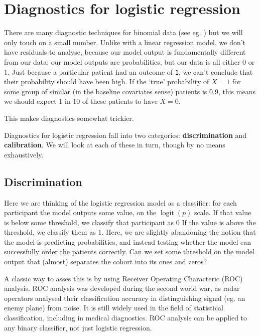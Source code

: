 \documentclass[
  openany]{book}
\theoremstyle{definition}
\theoremstyle{definition}
\theoremstyle{definition}
\theoremstyle{definition}
\theoremstyle{remark}
\begin{document}
\hypertarget{diagnostics-for-logistic-regression}{%
\section{Diagnostics for logistic regression}\label{diagnostics-for-logistic-regression}}

There are many diagnostic techniques for binomial data (see eg. \citet{collett_bin}) but we will only touch on a small number. Unlike with a linear regression model, we don't have residuals to analyse, because our model output is fundamentally different from our data: our model outputs are probabilities, but our data is all either 0 or 1. Just because a particular patient had an outcome of \texttt{1}, we can't conclude that their probability should have been high. If the `true' probability of \(X=1\) for some group of similar (in the baseline covariates sense) patients is 0.9, this means we should expect 1 in 10 of these patients to have \(X=0\).

This makes diagnostics somewhat trickier.

Diagnostics for logistic regression fall into two categories: \textbf{discrimination} and \textbf{calibration}. We will look at each of these in turn, though by no means exhaustively.

\hypertarget{discrimination}{%
\subsection{Discrimination}\label{discrimination}}

Here we are thinking of the logistic regression model as a classifier: for each participant the model outputs some value, on the \(\operatorname{logit}\left(p\right)\) scale. If that value is below some threshold, we classify that participant as 0 If the value is above the threshold, we classify them as 1. Here, we are slightly abandoning the notion that the model is predicting probabilities, and instead testing whether the model can successfully order the patients correctly. Can we set some threshold on the model output that (almost) separates the cohort into its ones and zeros?

A classic way to asses this is by using Receiver Operating Characteric (ROC) analysis. ROC analysis was developed during the second world war, as radar operators analysed their classification accuracy in distinguishing signal (eg. an enemy plane) from noise. It is still widely used in the field of statistical classification, including in medical diagnostics. ROC analysis can be applied to any binary classifier, not just logistic regression.
\end{document}
